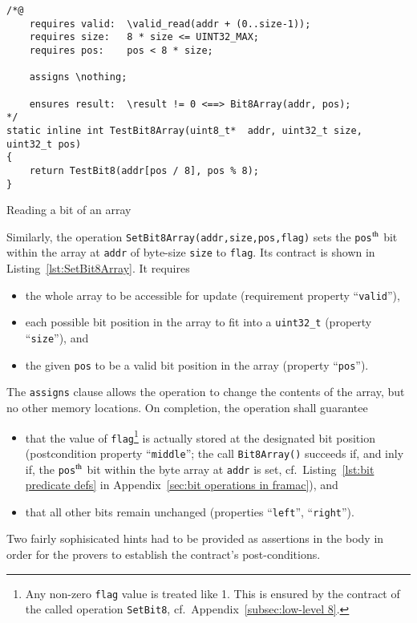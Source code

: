 \begin{listing}[hbt]
\begin{minipage}{0.99\textwidth}
\begin{lstlisting}[style=acsl-block]
/*@
    requires valid:  \valid_read(addr + (0..size-1));
    requires size:   8 * size <= UINT32_MAX;
    requires pos:    pos < 8 * size;

    assigns \nothing;

    ensures result:  \result != 0 <==> Bit8Array(addr, pos);
*/
static inline int TestBit8Array(uint8_t*  addr, uint32_t size, uint32_t pos)
{
    return TestBit8(addr[pos / 8], pos % 8);
}
\end{lstlisting}
\end{minipage}
\caption{\label{lst:TestBit8Array}Reading a bit of an  array}
\end{listing}










Similarly, the operation \lstinline{SetBit8Array(addr,size,pos,flag)}
sets the
\lstinline{pos}$^{\mbox{\scriptsize th}}$ bit within the array at
\lstinline{addr} of
byte-size \lstinline{size} to \lstinline{flag}.
%
Its contract is shown in Listing~\ref{lst:SetBit8Array}.
%
It requires
%
\begin{itemize}
\item the whole array to be accessible for update (requirement
	property ``\lstinline{valid}''),
\item each possible bit position in the array to fit into a
	\lstinline{uint32_t} (property ``\lstinline{size}''), and
\item the given \lstinline{pos} to be a valid bit position in the array
	(property ``\lstinline{pos}'').
\end{itemize}
%
The \lstinline{assigns} clause allows the operation to change the
contents of the array,
but no other memory locations.
%
On completion, the operation shall guarantee
\begin{itemize}
\item that the value of \lstinline{flag}\footnote{
		Any non-zero \lstinline{flag} value is treated like 1.
		This is ensured by the contract of the called operation
		\lstinline{SetBit8}, cf.\ Appendix~\ref{subsec:low-level 8}.
	}
	is actually stored at the designated bit
	position (postcondition property ``\lstinline{middle}'';
	the call \lstinline{Bit8Array()} succeeds if, and inly if, the
	\lstinline{pos}$^{\mbox{\scriptsize th}}$ bit within the byte
	array at \lstinline{addr} is set, 
	cf.\ Listing~\ref{lst:bit predicate defs} in
	Appendix~\ref{sec:bit operations in framac}), and
\item that all other bits remain unchanged 
	(properties ``\lstinline{left}'', ``\lstinline{right}'').
\end{itemize}
%
Two fairly sophisicated hints had to be provided as assertions in
the body in order for
the provers to establish the contract's post-conditions.









